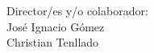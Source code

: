 {\raggedleft
Director/es y/o colaborador:\\
   \vspace{ 1cm}
José Ignacio Gómez\\
Christian Tenllado\\
}



